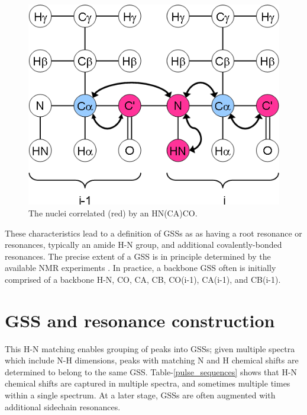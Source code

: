 \begin{figure}
  \includegraphics[scale=0.5]{figures/ccpn_hncaco}
  \caption[The nuclei correlated by an HN(CA)CO.]
          {The nuclei correlated (red) by an HN(CA)CO.}
  \label{ccpn_hncaco}
\end{figure}

These characteristics lead to a definition of GSSs as as having a root 
resonance or resonances, typically an amide H-N group, and additional 
covalently-bonded resonances.  The precise extent of a GSS is in principle 
determined by the available NMR experiments \cite{hncacb, hnco, cbcaconh}.  
In practice, a backbone GSS often is initially 
comprised of a backbone H-N, CO, CA, CB, CO(i-1), CA(i-1), and CB(i-1).  


\section{GSS and resonance construction}

This H-N matching enables grouping of peaks into GSSs; given multiple spectra
which include N-H dimensions, peaks with matching N and H chemical shifts are
determined to belong to the same GSS.
Table-\ref{pulse_sequences} shows that H-N chemical shifts are captured in 
multiple spectra, and sometimes multiple times within a single spectrum.
At a later stage, GSSs are often augmented with additional sidechain resonances.


